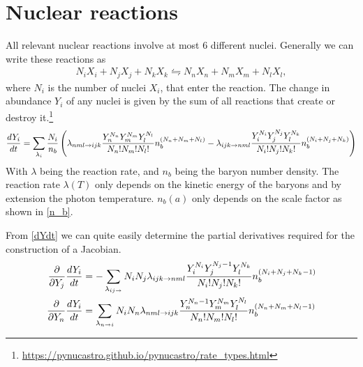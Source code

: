 %
%
\section{Nuclear reactions}
\label{sec:nucleartheory}

All relevant nuclear reactions involve at most 6 different nuclei. Generally we can write these reactions as
\begin{align}
    N_i X_i + N_j X_j + N_k X_k \leftrightharpoons N_n X_n + N_m X_m + N_l X_l ,
\end{align}
where $N_i$ is the number of nuclei $X_i$, that enter the reaction. 
The change in abundance $Y_i$ of any nuclei is given by the sum of all reactions that create or destroy it.\footnote{\url{https://pynucastro.github.io/pynucastro/rate_types.html}}
\begin{align}
    \frac{dY_i}{dt}=\sum_{\lambda_i}\frac{N_i}{n_b}\left(\lambda_{n m l \rightarrow i j k} \frac{Y_n^{N_n}Y_m^{N_m}Y_l^{N_l}}{N_n!N_m!N_l!}n_b^{(N_n+N_m+N_l)}-\lambda_{i j k \rightarrow n m l}\frac{Y_i^{N_i}Y_j^{N_j}Y_l^{N_k}}{N_i!N_j!N_k!}n_b^{(N_i+N_j+N_k)}\right)
    \label{dYdt}
\end{align}
With $\lambda$ being the reaction rate, and $n_b$ being the baryon number density. The reaction rate $\lambda(T)$ only depends on the kinetic energy of the baryons and by extension the photon temperature. $n_b(a)$ only depends on the scale factor as shown in \eqref{n_b}. 

From \eqref{dYdt} we can quite easily determine the partial derivatives required for the construction of a Jacobian. 
\begin{align}
    \frac{\partial }{\partial Y_j}\frac{dY_i}{dt}&=-\sum_{\lambda_{ij\rightarrow}}N_i N_j\lambda_{i j k \rightarrow n m l}\frac{Y_i^{N_i}Y_j^{N_j-1}Y_l^{N_k}}{N_i!N_j!N_k!}n_b^{(N_i+N_j+N_k-1)}\label{eq:jacterms1}\\
    \frac{\partial }{\partial Y_n}\frac{dY_i}{dt}&=\sum_{\lambda_{n \rightarrow i }}N_i N_n\lambda_{n m l \rightarrow i j k} \frac{Y_n^{N_n-1}Y_m^{N_m}Y_l^{N_l}}{N_n!N_m!N_l!}n_b^{(N_n+N_m+N_l-1)}
    \label{eq:jacterms2}
\end{align}


